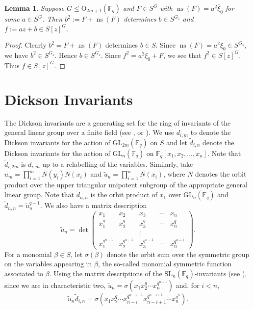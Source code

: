 \documentclass{amsart}
\newtheorem{lemma}[subsection]{Lemma}
\newcommand{\field}{\mathbb{F}}
\newcommand{\gl}[2]{{{\text{GL}_{{#1}}(\field_{#2})}}}
\newcommand{\SL}[2]{{{\text{SL}_{{#1}}(\field_{#2})}}}
\newcommand{\orth}[2]{{{\text{O}_{{#1}}(\field_{#2})}}}
\DeclareMathOperator{\ns}{ns}
\begin{document}
\begin{lemma} \label{inv-cons-lem} Suppose $G\leq\orth{2m+1}{q}$ and $F\in S^G$ with $\ns(F)=a^2\overline{\xi}_0$ for some $a\in S^G$. Then
$b^2:=F+\ns(F)$ determines $b\in S^{G_z}$ and $f:=az+b\in S[z]^G$.
\end{lemma}
\begin{proof}
Clearly $b^2=F+\ns(F)$ determines $b\in S$.
Since $\ns(F)=a^2\overline{\xi}_0\in S^{G_z}$, we have $b^2\in S^{G_z}$.
Hence $b\in S^{G_z}$. Since $f^2=a^2\xi_0+F$, we see that $f^2\in S[z]^G$.
Thus $f\in S[z]^G$.
\end{proof}

\section{Dickson Invariants}\label{sec: dicksons}

The Dickson invariants are a generating set for the ring of invariants of the general linear group over a finite field
(see \cite[\S 8.1]{benson-polyinvafinigrou:93},  
\cite[\S 3.3]{campbell+wehlau:mit11} or
\cite{wilkerson-primdickinva:83}).
We use $d_{i,m}$ to denote the Dickson invariants for
the action of $\gl{2m}{q}$ on $S$ and let $\widetilde{d}_{i,n}$ denote the Dickson invariants for the action of
$\gl{n}{q}$ on $\field_q[x_1,x_2,\ldots,x_n]$. 
Note that $\widetilde{d}_{i,2m}$ is $d_{i,m}$ up to a relabelling of the variables. Similarly, take $u_m=\prod_{i=1}^mN(y_i)N(x_i)$ and $\widetilde{u}_n=\prod_{i=1}^n N(x_i)$,
where  $N$ denotes the orbit product over the upper triangular unipotent subgroup of the appropriate general linear group.
Note that $\widetilde{d}_{n,n}$ is the orbit product of $x_1$ over 
$\gl{n}{q}$ and $\widetilde{d}_{n,n}=\widetilde{u}_n^{q-1}$.
We also have a matrix description
$$\widetilde{u}_n=\det
\begin{pmatrix}
x_1&x_2&x_3&\cdots&x_n\\
x_1^q&x_2^q&x_3^q&\cdots & x_n^q\\
&&\vdots&&\\
x_1^{q^{n-1}}&x_2^{q^{n-1}}&x_3^{q^{n-1}}&\cdots & x_n^{q^{n-1}}
\end{pmatrix}.$$
For a monomial $\beta\in S$, let $\sigma(\beta)$ denote the orbit sum over the symmetric group on the variables appearing in $\beta$, 
the so-called monomial symmetric function associated to $\beta$.
Using the matrix descriptions of the $\SL{n}{q}$-invariants
(see \cite{wilkerson-primdickinva:83}), since we are in characteristic two, $\widetilde{u}_n=\sigma(x_1x_2^q\cdots x_n^{q^{n-1}})$
and, for $i<n$,  $$\widetilde{u}_n\widetilde{d}_{i,n}=\sigma(x_1x_2^q\cdots x_{n-i}^{q^{n-i-1}} x_{n-i+1}^{q^{n-i+1}}\cdots x_n^{q^n}).$$
\end{document}
